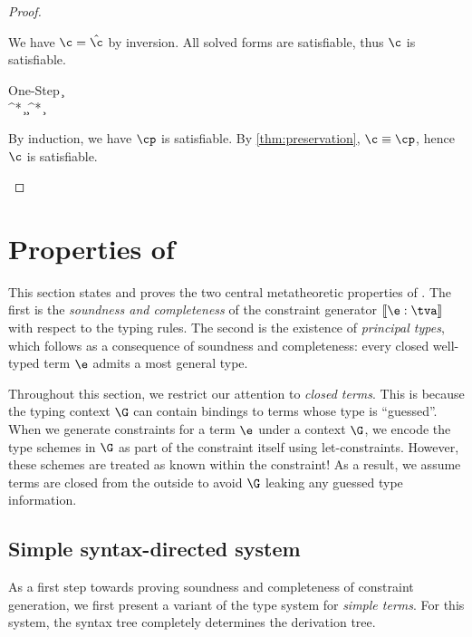 \documentclass[acmsmall,screen,nonacm%
\Anonymous{,anonymous}{}%
\Final{}{,review}%
]{acmart}
\begin{document}
\begin{corollary}
\begin{proof}
\begin{proofcases}
\begin{proofcases}
	We have $\c = \hat\c$ by inversion. All solved forms are satisfiable, thus
	$\c$ is satisfiable.

	\proofcaserewrite
	  {One-Step}
	  {\c \csolve \cp \\ \cp \csolve^* \hat\c}
	  {\c \csolve^* \hat\c}

	  By induction, we have $\cp$ is satisfiable. By \cref{thm:preservation},
	  $\c \cequiv \cp$, hence $\c$ is satisfiable.

      \end{proofcases}
    \end{proofcases}
  \end{proof}
\end{corollary}

\section{Properties of \OML}
\label{app/oml/proofs}


This section states and proves the two central metatheoretic properties of
\OML. The first is the \emph{soundness and completeness} of the constraint
generator $\cinfer \e \tv$ with respect to the \OML typing rules. The second
is the existence of \emph{principal types}, which follows as a consequence
of soundness and completeness: every closed well-typed term $\e$ admits a
most general type.


Throughout this section, we restrict our attention to \emph{closed
terms}. This is because the typing context $\G$ can contain bindings to
terms whose type is ``guessed''. When we generate constraints for a term
$\e$ under a context $\G$, we encode the type schemes in $\G$ as part of the
constraint itself using let-constraints. However, these schemes are
treated as known within the constraint! As a result, we assume terms are
closed from the outside to avoid $\G$ leaking any guessed type information.

\subsection{Simple syntax-directed system}

As a first step towards proving soundness and completeness of constraint
generation, we first present a variant of the \OML type system for
\emph{simple terms}. For this system, the syntax tree completely determines
the derivation tree.
\end{document}
